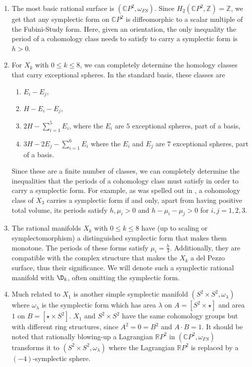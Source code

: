 \begin{exam}


\begin{enumerate}
\hfill

\item The most basic rational surface is $(\mathbb{C}P^2,\omega_{FS})$. Since $H_2(\mathbb{C}P^2,\mathbb{Z})=\mathbb{Z}$, we get that any symplectic form on $\mathbb{C}P^2$ is diffeomorphic to a scalar multiple of the Fubini-Study form. Here, given an orientation, the only inequality the period of a cohomology class needs to satisfy to carry a symplectic form is $h>0$.
   
\item For $X_k$ with $0\leq k\leq 8$, we can completely determine the homology classes that carry exceptional spheres. In the standard basis, these classes are
         
         \begin{enumerate}
            \item $E_i-E_j$,
            \item $H-E_i-E_j$,
            \item $2H-\sum_{i=1}^5 E_i$, where the $E_i$ are $5$ exceptional spheres, part of a basis,
            \item $3H-2E_j-\sum_{i=1}^6 E_i$ where the $E_i$ and $E_j$ are $7$ exceptional spheres, part of a basis.
        \end{enumerate}
    Since these are a finite number of classes, we can completely determine the inequalities that the periods of a cohomology class must satisfy in order to carry a symplectic form. For example, as was spelled out in \cite{SS}, a cohomology class of $X_3$ carries a symplectic form if and only, apart from having positive total volume, its periods satisfy $h,\mu_i>0$ and $h-\mu_i-\mu_j>0$ for $i,j=1,2,3$.

 \item The rational manifolds $X_k$ with $0\leq k \leq 8$ have (up to scaling or symplectomorphism) a distinguished symplectic form that makes them monotone. The periods of these forms satisfy $\mu_i=\frac{h}{3}$. Additionally, they are compatible with the complex structure that makes the $X_k$ a del Pezzo surface, thus their significance. We will denote such a symplectic rational manifold with $\D_k$, often omitting the symplectic form.
   
 \item Much related to $X_1$ is another simple symplectic manifold $(S^2\times S^2,\omega_\lambda)$ where $\omega_\lambda$ is the symplectic form which has area $\lambda$ on $A=[S^2\times \star]$ and area $1$ on $B=[\star\times S^2]$. $X_1$ and $S^2\times S^2$ have the same cohomology groups but with different ring structures, since $A^2=0=B^2$ and $A\cdot B=1$. It should be noted that rationally blowing-up a Lagrangian $\mathbb{R}P^2$ in $(\mathbb{C}P^2,\omega_{FS})$ transforms it to $(S^2\times S^2,\omega_\lambda)$ where the Lagrangian $\mathbb{R}P^2$ is replaced by a $(-4)$-symplectic sphere.


\end{enumerate}   
\end{exam}



